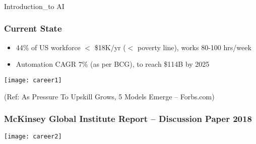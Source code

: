 \begin{frame}[fragile]\frametitle{}
\begin{center}
{\Large Introduction_to AI}
\end{center}
\end{frame}


\begin{frame}[fragile]\frametitle{Current State}
\begin{itemize}
\item 44\% of US workforce $<$ \$18K/yr ($<$ poverty line), works 80-100 hrs/week
\item Automation CAGR 7\% (as per BCG), to reach \$114B by 2025
\end{itemize}

\begin{center}
\texttt{[image: career1]}
\end{center}

{\tiny (Ref: As Pressure To Upskill Grows, 5 Models Emerge – Forbs.com)}
\end{frame}


\begin{frame}[fragile]\frametitle{McKinsey Global Institute Report – Discussion Paper 2018}



\begin{center}
\texttt{[image: career2]}
\end{center}

\end{frame}



